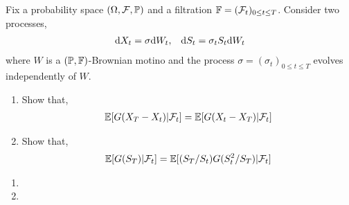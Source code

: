 \begin{problem}
    Fix a probability space \( (\Omega,\mathcal{F},\mathbb{P}) \) and a filtration \( \mathbb{F} = (\mathcal{F}_t)_{0\leq t\leq T} \). Consider two processes,
    \begin{align*}
        \mathrm{d} X_t = \sigma \mathrm{d} W_t, && \mathrm{d} S_t = \sigma_t S_t \mathrm{d} W_t
    \end{align*}
    where \( W \) is a \( (\mathbb{P},\mathbb{F}) \)-Brownian motino and the process \( \sigma = (\sigma_t)_{0\leq t\leq T} \) evolves independently of \( W \).
\begin{enumerate}[nolistsep,label=(\alph*)]
    \item Show that,
        \begin{align*}
            \mathbb{E}[G(X_T-X_t)|\mathcal{F}_t] = \mathbb{E}[G(X_t-X_T)|\mathcal{F}_t]
        \end{align*}
    \item Show that,
        \begin{align*}
            \mathbb{E}[G(S_T)|\mathcal{F}_t] = \mathbb{E}[(S_T/S_t) G(S_t^2/S_T) | \mathcal{F}_t]
        \end{align*}
        
\end{enumerate}

\end{problem}

\begin{solution}[Solution]
\begin{enumerate}[label=(\alph*)]
    \item 
    \item 
\end{enumerate}
\end{solution}


